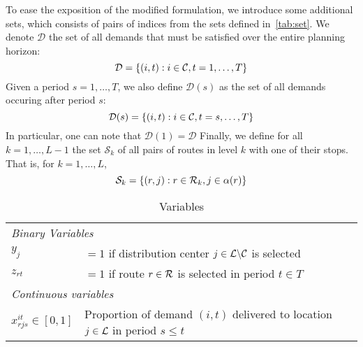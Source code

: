         To ease the exposition of the modified formulation, we introduce some additional sets, which consists of pairs of indices from the sets defined in~\ref{tab:set}.
        We denote $\mathcal{D}$ the set of all demands that must be satisfied over the entire planning horizon:
        \begin{equation*}
            \mathcal{D} =\left\{(i,t) : i\in\mathcal{C}, t=1,\ldots,T\right\}
        \end{equation*}
        Given a period $s=1,\ldots,T$, we also define $\mathcal{D}(s)$ as the set of all demands occuring after period $s$:
        \begin{equation*}
            \mathcal{D}(s) =\left\{(i,t) : i\in\mathcal{C}, t=s,\ldots,T\right\}
        \end{equation*}
        In particular, one can note that $\mathcal{D}(1) = \mathcal{D}$
    Finally, we define for all $k=1,\ldots,L-1$ the set $\mathcal{S}_k$ of all pairs of routes in level $k$ with one of their stops. That is, for $k=1,\ldots,L$,
        \begin{equation*}
            \mathcal{S}_k =\left\{(r,j) : r\in\mathcal{R}_k, j\in\alpha(r)\right\}
        \end{equation*}
        \begin{table}[htbp]
        \centering
        \begin{tabular}{ll}
        \toprule
        \multicolumn{2}{l}{\textit{Binary Variables}}\\
            $y_{j}$ & $=1$ if distribution center $j \in \mathcal{L} \backslash \mathcal{C}$ is selected \\
            $z_{rt}$ & $=1$ if route $r \in \mathcal{R}$  is selected in period $t \in T$\\
            \midrule
            \multicolumn{2}{l}{\textit{Continuous variables}}\\
                $x^{it}_{rjs}\in[0,1]$ & Proportion of demand $(i,t)$ delivered to location $j\in \mathcal{L}$ in period $s\leq t$\\
                \bottomrule
                \end{tabular}
                \caption{Variables}
                \label{tab:var2}
                \end{table}    

